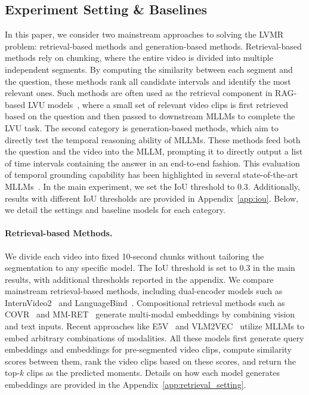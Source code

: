 \documentclass{article}
\begin{document}
\subsection{Experiment Setting \& Baselines}
In this paper, we consider two mainstream approaches to solving the LVMR problem: retrieval-based methods and generation-based methods. Retrieval-based methods rely on chunking, where the entire video is divided into multiple independent segments. By computing the similarity between each segment and the question, these methods rank all candidate intervals and identify the most relevant ones. Such methods are often used as the retrieval component in RAG-based LVU models~\cite{yuan2025memory,ataallah2024goldfish,luo2024videorag}, where a small set of relevant video clips is first retrieved based on the question and then passed to downstream MLLMs to complete the LVU task. The second category is generation-based methods, which aim to directly test the temporal reasoning ability of MLLMs. These methods feed both the question and the video into the MLLM, prompting it to directly output a list of time intervals containing the answer in an end-to-end fashion. This evaluation of temporal grounding capability has been highlighted in several state-of-the-art MLLMs~\cite{bai2025qwen25vl,guo2025seed15vltechnicalreport}. In the main experiment, we set the IoU threshold to 0.3. Additionally, results with different IoU thresholds are provided in Appendix~\ref{app:iou}. Below, we detail the settings and baseline models for each category.

\paragraph{Retrieval-based Methods.}
We divide each video into fixed 10-second chunks without tailoring the segmentation to any specific model. The IoU threshold is set to 0.3 in the main results, with additional thresholds reported in the appendix. We compare mainstream retrieval-based methods, including dual-encoder models such as InternVideo2~\cite{wang2025internvideo2} and LanguageBind~\cite{zhu2023languagebind}. Compositional retrieval methods such as COVR~\cite{ventura2024covr} and MM-RET~\cite{zhou2024megapairs} generate multi-modal embeddings by combining vision and text inputs. Recent approaches like E5V~\cite{jiang2024e5} and VLM2VEC~\cite{jiang2025vlm2vec} utilize MLLMs to embed arbitrary combinations of modalities. All these models first generate query embeddings and embeddings for pre-segmented video clips, compute similarity scores between them, rank the video clips based on these scores, and return the top-$k$ clips as the predicted moments. Details on how each model generates embeddings are provided in the Appendix~\ref{app:retrieval_setting}.
\end{document}
